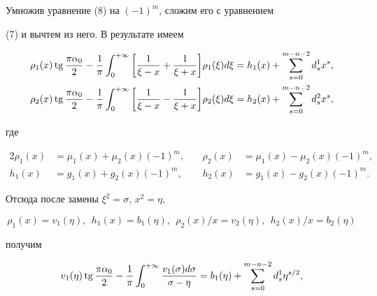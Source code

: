 \begin{pf} 


Умножив уравнение (8) на $(-1)^m$, сложим его с уравнением 


(7) и вычтем из него. В результате имеем 


\begin{align*} 


\rho_1(x)\tg\frac{\pi\alpha_0}{2}-\frac{1}{\pi} 


\int^{+\infty}_0\bigg[\frac{1}{\xi-x}+\frac{1}{\xi+x}\bigg] 


\rho_1(\xi)d\xi&=h_1(x)+\sum^{m-n-2}_{s=0} d^1_s x^s,\\ 


% 


\rho_2(x)\tg\frac{\pi\alpha_0}{2}-\frac{1}{\pi} 


\int^{+\infty}_0\bigg[\frac{1}{\xi-x}-\frac{1}{\xi+x}\bigg] 


\rho_2(\xi)d\xi&=h_2(x)+\sum^{m-n-2}_{s=0} d^2_s x^s,


\end{align*} 


где 


\begin{alignat*}{2} 


\rho_1(x)&=\mu_1(x)+\mu_2(x)(-1)^m,&\quad 


\rho_2(x)&=\mu_1(x)-\mu_2(x)(-1)^m,\\ 


h_1(x)&=g_1(x)+g_2(x)(-1)^m,&\quad 


h_2(x)&=g_1(x)-g_2(x)(-1)^m. 


\end{alignat*} 


Отсюда после замены $\xi^2=\sigma$, $x^2=\eta$, 


$$ 


\rho_1(x)=v_1(\eta),\ \ h_1(x)=b_1(\eta), 


\ \ \rho_2(x)/x=v_2(\eta),\ \ h_2(x)/x=b_2(\eta) 


$$ 


получим 


\begin{align} 


v_1(\eta)\tg\frac{\pi\alpha_0}{2}-\frac{1}{\pi} 


\int^{+\infty}_0\frac{v_1(\sigma)d\sigma}{\sigma-\eta} 


&=b_1(\eta)+\sum^{m-n-2}_{s=0}d^1_s\eta^{s/2},\\ 


% 



\end{align}
\end{pf}
